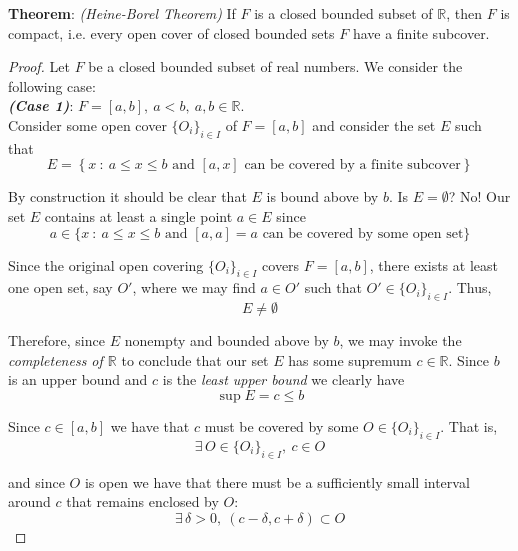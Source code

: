 \documentclass[12pt]{article}
\newlength\tindent
\renewcommand{\indent}{\hspace*{\tindent}}
\newcommand{\R}{\mathbb R}
\begin{document}
%
%
{\bf Theorem}: {\em (Heine-Borel Theorem)} If $F$ is a closed bounded subset of $\R$, then $F$ is compact, i.e. every open cover of closed bounded sets $F$ have a finite subcover.

\begin{proof} Let $F$ be a closed bounded subset of real numbers. We consider the following case: \\

{\bf \em (Case 1)}: $F = [a,b],~a < b,~ a,b \in \R$. \\

Consider some open cover $\{O_i\}_{i \in I}$ of $F = [a,b]$ and consider the set $E$ such that
\begin{equation*}
	E = \left\{ x ~:~ a \leq x \leq b \text{ and } [a,x] \text{ can be covered by a finite subcover} \right\}
\end{equation*}

\indent By construction it should be clear that $E$ is bound above by $b$. Is $E = \emptyset$? No! Our set $E$ contains at least a single point $a \in E$ since
\begin{equation*}
	a \in \{ x~:~a \leq x \leq b \text{ and $[a,a] = a$ can be covered by some open set} \}
\end{equation*}

\indent  Since the original open covering $\{O_i\}_{i\in I}$ covers $F = [a,b]$, there exists at least one open set, say $O'$, where we may find $a \in O'$ such that $O' \in \{O_i\}_{i\in I}$. Thus,
\begin{equation*}
	E \neq \emptyset
\end{equation*}

\indent Therefore, since $E$ nonempty and bounded above by $b$, we may invoke the {\em completeness of $\R$} to conclude that our set $E$ has some supremum $c \in \R$. Since $b$ is an upper bound and $c$ is the {\em least upper bound} we clearly have
\begin{equation*}
	\sup E = c \leq b
\end{equation*}

\indent Since $c \in [a,b]$ we have that $c$ must be covered by some $O \in \{O_i\}_{i\in I}$. That is, 
\begin{equation*}
	\exists\,O \in \{O_i\}_{i\in I},~ c \in O
\end{equation*}

and since $O$ is open we have that there must be a sufficiently small interval around $c$ that remains enclosed by $O$:
\begin{equation*}
	\exists\,\delta > 0,~(c - \delta, c + \delta) \subset O
\end{equation*}


\end{proof}
\end{document}
